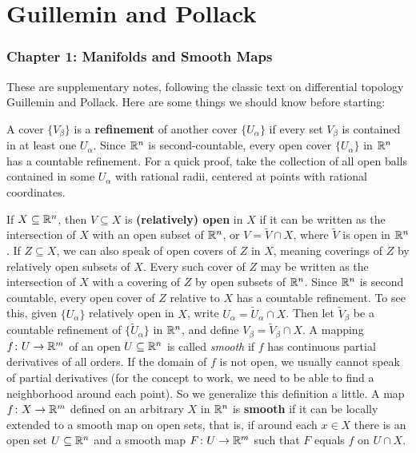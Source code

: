 \part{Guillemin and Pollack}
\section{Chapter 1: Manifolds and Smooth Maps}
\begin{center}
\end{center}
These are supplementary notes, following the classic text on differential topology Guillemin and Pollack. Here are some things we should know before starting:

A cover $\{V_{\beta }\} $ is a \textbf{refinement} of another cover $\{U_{\alpha }\} $ if every set $V_{\beta }$ is contained in at least one $U_{\alpha }$. Since $\mathbb{R}^n $ is second-countable, every open cover $\{U_{\alpha }\} $ in $\mathbb{R}^n $ has a countable refinement. For a quick proof, take the collection of all open balls contained in some $U_{\alpha }$ with rational radii, centered at points with rational coordinates.

If $X\subseteq \mathbb{R}^n $, then $V\subseteq X$ is \textbf{(relatively) open} in $X$ if it can be written as the intersection of $X$ with an open subset of $\mathbb{R}^n$, or $V= \widetilde V \cap X$, where $\widetilde V$ is open in $\mathbb{R}^n $. If $Z\subseteq X$, we can also speak of open covers of $Z$ in $X$, meaning coverings of $Z$ by relatively open subsets of $X$. Every such cover of $Z$ may be written as the intersection of $X$ with a covering of $Z$ by open subsets of $\mathbb{R}^n $. Since $\mathbb{R}^n $ is second countable, every open cover of $Z$ relative to $X$ has a countable refinement. To see this, given $\{U_{\alpha }\} $ relatively open in $X$, write $U_{\alpha }= \widetilde U_{\alpha }\cap  X$. Then let $\widetilde V _{\beta }$ be a countable refinement of $\{\widetilde U_{\alpha }\} $ in $\mathbb{R}^n $, and define $V_{\beta }=\widetilde V_{\beta }\cap X$.
\orbreak
A mapping $f \colon U \to \mathbb{R}^m $ of an open $U\subseteq \mathbb{R}^n $ is called \emph{smooth} if $f$ has continuous partial derivatives of all orders. If the domain of $f$ is not open, we usually cannot speak of partial derivatives (for the concept to work, we need to be able to find a neighborhood around each point). So we generalize this definition a little. A map $f \colon X \to \mathbb{R}^m$ defined on an arbitrary $X$ in $\mathbb{R}^n $ is \textbf{smooth} if it can be locally extended to a smooth map on open sets, that is, if around each $x \in X$ there is an open set $U \subseteq \mathbb{R}^n $ and a smooth map $F \colon U \to \mathbb{R}^m$ such that $F$ equals $f$ on $U \cap X$. 

